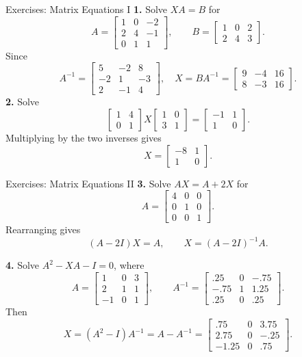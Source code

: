 \begin{frame}[shrink=9]{Exercises: Matrix Equations I}
\textbf{1.} Solve $XA=B$ for
\[
A=\begin{bmatrix}1&0&-2\\2&4&-1\\0&1&1\end{bmatrix},
\qquad
B=\begin{bmatrix}1&0&2\\2&4&3\end{bmatrix}.
\]
Since
\[
A^{-1}=\begin{bmatrix}5&-2&8\\-2&1&-3\\2&-1&4\end{bmatrix},
\quad
X=BA^{-1}=\begin{bmatrix}9&-4&16\\8&-3&16\end{bmatrix}.
\]
\textbf{2.} Solve
\[
\begin{bmatrix}1&4\\0&1\end{bmatrix}
X
\begin{bmatrix}1&0\\3&1\end{bmatrix}
=\begin{bmatrix}-1&1\\1&0\end{bmatrix}.
\]
Multiplying by the two inverses gives
\[
X=\begin{bmatrix}-8&1\\1&0\end{bmatrix}.
\]
\end{frame}

\begin{frame}[shrink=10]{Exercises: Matrix Equations II}
\textbf{3.} Solve $AX=A+2X$ for
\[
A=\begin{bmatrix}4&0&0\\0&1&0\\0&0&1\end{bmatrix}.
\]
Rearranging gives
\[
(A-2I)X=A,\qquad X=(A-2I)^{-1}A.
\]
\medskip

\textbf{4.} Solve $A^2-XA-I=0$, where
\[
A=\begin{bmatrix}1&0&3\\2&1&1\\-1&0&1\end{bmatrix},
\qquad
A^{-1}=\begin{bmatrix}.25&0&-.75\\-.75&1&1.25\\.25&0&.25\end{bmatrix}.
\]
Then
\[
X=(A^2-I)A^{-1}=A-A^{-1}
=\begin{bmatrix}.75&0&3.75\\2.75&0&-.25\\-1.25&0&.75\end{bmatrix}.
\]
\end{frame}

